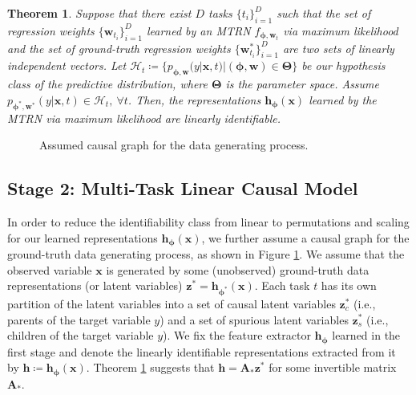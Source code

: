 \documentclass[nohyperref]{article}
\theoremstyle{plain}
\newtheorem{theorem}{Theorem}[section]
\theoremstyle{definition}
\theoremstyle{remark}
\begin{document}
\begin{theorem}\label{thm:lin-id}
    Suppose that there exist $D$ tasks $\{t_i\}_{i=1}^D$ such that the set of regression weights $\{\mathbf{w}_{t_i}\}_{i=1}^D$ learned by an MTRN $f_{\boldsymbol{\phi},\mathbf{w}_t}$ via maximum likelihood and the set of ground-truth regression weights $\{\mathbf{w}_{t_i}^*\}_{i=1}^D$ are two sets of linearly independent vectors.
    Let $\mathcal{H}_t\coloneqq\{p_{\boldsymbol{\phi},\mathbf{w}}(y|\mathbf{x},t)|(\boldsymbol{\phi},\mathbf{w})\in\boldsymbol{\Theta}\}$ be our hypothesis class of the predictive distribution, where $\boldsymbol{\Theta}$ is the parameter space. Assume $p_{\boldsymbol{\phi}^*,\mathbf{w}^*}(y|\mathbf{x},t)\in\mathcal{H}_t,~\forall t$. 
    Then, the representations $\mathbf{h}_{\boldsymbol{\phi}}(\mathbf{x})$ learned by the MTRN via maximum likelihood are linearly identifiable.
    \label{thm:linear-identifiability}
\end{theorem}

\begin{figure}[!ht]
    \centering
    \caption{Assumed causal graph for the data generating process.}
    \label{fig:causal-graph}
\end{figure}

\subsection{Stage 2: Multi-Task Linear Causal Model} 
In order to reduce the identifiability class from linear to permutations and scaling for our learned representations $\mathbf{h}_{\boldsymbol{\phi}}(\mathbf{x})$, we further assume a causal graph for the ground-truth data generating process, as shown in Figure \ref{fig:causal-graph}. We assume that the observed variable $\mathbf{x}$ is generated by some (unobserved) ground-truth data representations (or latent variables) $\mathbf{z}^*=\mathbf{h}_{\boldsymbol{\phi}^*}(\mathbf{x})$. Each task $t$ has its own partition of the latent variables into a set of causal latent variables $\mathbf{z}_c^*$ (i.e., parents of the target variable $y$) and a set of spurious latent variables $\mathbf{z}_s^*$ (i.e., children of the target variable $y$). We fix the feature extractor $\mathbf{h}_{\boldsymbol{\phi}}$ learned in the first stage and denote the linearly identifiable representations extracted from it by $\mathbf{h}\coloneqq\mathbf{h}_{\boldsymbol{\phi}}(\mathbf{x})$. Theorem \ref{thm:lin-id} suggests that $\mathbf{h}=\mathbf{A}_{*}\mathbf{z}^*$ for some invertible matrix $\mathbf{A}_{*}$.
\end{document}
